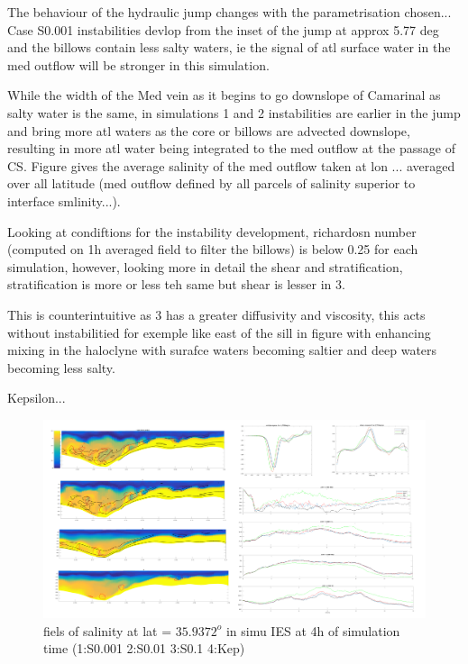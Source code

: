 The behaviour of the hydraulic jump changes with the parametrisation chosen... Case S0.001 instabilities devlop from the inset of the jump at approx 5.77 deg and the billows contain less salty waters, ie the signal of atl surface water in the med outflow will be stronger in this simulation.


While the width of the Med vein as it begins to go downslope of Camarinal as salty water is the same, in simulations 1 and 2 instabilities are earlier in the jump and bring more atl waters as the core or billows are advected downslope, resulting in more atl water being integrated to the med outflow at the passage of CS. Figure gives the average salinity of the med outflow taken at lon ... averaged over all latitude (med outflow defined by all parcels of salinity superior to interface smlinity...).

Looking at condiftions for the instability development, richardosn number (computed on 1h averaged field to filter the billows) is below 0.25 for each simulation, however, looking more in detail the shear and stratification, stratification is more or less teh same but shear is lesser in 3.

This is counterintuitive as 3 has a greater diffusivity and viscosity, this acts without instabilitied for exemple like east of the sill in figure with enhancing mixing in the haloclyne with surafce waters becoming saltier and deep waters becoming less salty.

Kepsilon...


\begin{figure}[!h]
 \includegraphics[width=\textwidth]{./GBR3D/Figsmago.png}
 \caption {fiels of salinity at lat = $35.9372^o$ in simu IES at 4h of simulation time  (1:S0.001  2:S0.01  3:S0.1 4:Kep)}
\end{figure}

